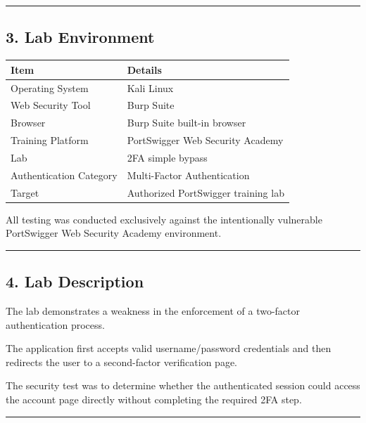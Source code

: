 \documentclass[
]{article}
\newcounter{none} %
\begin{document}
\begin{center}\rule{0.5\linewidth}{0.5pt}\end{center}

\subsection{3. Lab Environment}\label{lab-environment}

{\def\LTcaptype{none} %
\begin{longtable}[]{@{}ll@{}}
\toprule\noalign{}
Item & Details \\
\midrule\noalign{}
\endhead
\bottomrule\noalign{}
\endlastfoot
Operating System & Kali Linux \\
Web Security Tool & Burp Suite \\
Browser & Burp Suite built-in browser \\
Training Platform & PortSwigger Web Security Academy \\
Lab & 2FA simple bypass \\
Authentication Category & Multi-Factor Authentication \\
Target & Authorized PortSwigger training lab \\
\end{longtable}
}

All testing was conducted exclusively against the intentionally
vulnerable PortSwigger Web Security Academy environment.

\begin{center}\rule{0.5\linewidth}{0.5pt}\end{center}

\subsection{4. Lab Description}\label{lab-description}

The lab demonstrates a weakness in the enforcement of a two-factor
authentication process.

The application first accepts valid username/password credentials and
then redirects the user to a second-factor verification page.

The security test was to determine whether the authenticated session
could access the account page directly without completing the required
2FA step.

\begin{center}\rule{0.5\linewidth}{0.5pt}\end{center}
\end{document}
